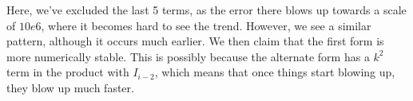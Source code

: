 Here, we've excluded the last 5 terms, as the error there blows up towards a scale of $10e6$, where it becomes hard to see the trend. However, we see a similar pattern, although it occurs much earlier. We then claim that the first form is more numerically stable. This is possibly because the alternate form has a $k^2$ term in the product with $I_{i-2}$, which means that once things start blowing up, they blow up much faster. 